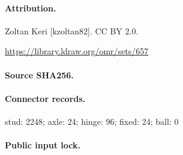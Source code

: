 \paragraph{Attribution.}Zoltan Keri [kzoltan82]. CC BY 2.0.\par\url{https://library.ldraw.org/omr/sets/657}
\paragraph{Source SHA256.}
\paragraph{Connector records.}stud: 2248; axle: 24; hinge: 96; fixed: 24; ball: 0
\paragraph{Public input lock.}
